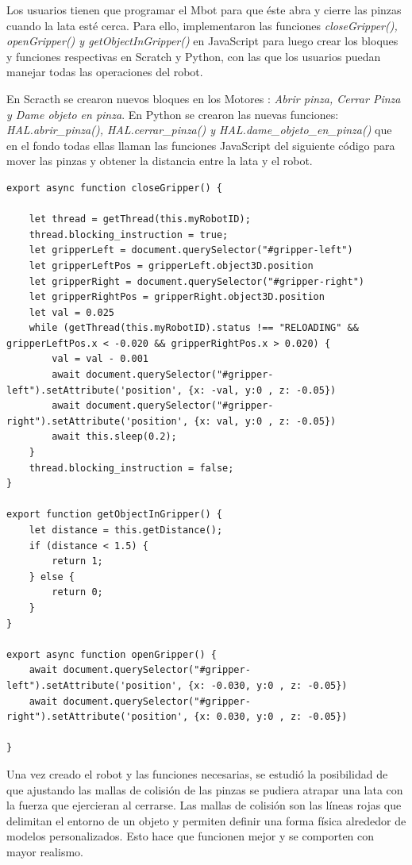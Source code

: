Los usuarios tienen que programar el Mbot para que éste abra y cierre las pinzas cuando la lata esté cerca. Para ello, implementaron las funciones \textit{closeGripper(), openGripper() y getObjectInGripper()} en JavaScript para luego crear los bloques y funciones respectivas en Scratch y Python, con las que los usuarios puedan manejar todas las operaciones del robot. 
 
En Scracth se crearon nuevos bloques en los Motores : \textit{Abrir pinza, Cerrar Pinza y Dame objeto en pinza}.
En Python  se crearon las nuevas funciones: \textit{HAL.abrir\_pinza(), HAL.cerrar\_pinza() y  HAL.dame\_objeto\_en\_pinza()} que en el fondo todas ellas llaman las funciones JavaScript  del siguiente código para mover las pinzas y obtener la distancia entre la lata y el robot.
 
\begin{lstlisting}
export async function closeGripper() {

    let thread = getThread(this.myRobotID);
    thread.blocking_instruction = true;
    let gripperLeft = document.querySelector("#gripper-left")
    let gripperLeftPos = gripperLeft.object3D.position
    let gripperRight = document.querySelector("#gripper-right")
    let gripperRightPos = gripperRight.object3D.position
    let val = 0.025
    while (getThread(this.myRobotID).status !== "RELOADING" && gripperLeftPos.x < -0.020 && gripperRightPos.x > 0.020) {
        val = val - 0.001
        await document.querySelector("#gripper-left").setAttribute('position', {x: -val, y:0 , z: -0.05})
        await document.querySelector("#gripper-right").setAttribute('position', {x: val, y:0 , z: -0.05})
        await this.sleep(0.2);
    }
    thread.blocking_instruction = false;
}

export function getObjectInGripper() {
    let distance = this.getDistance();
    if (distance < 1.5) {
        return 1;
    } else {
        return 0;
    }
}

export async function openGripper() {
    await document.querySelector("#gripper-left").setAttribute('position', {x: -0.030, y:0 , z: -0.05})
    await document.querySelector("#gripper-right").setAttribute('position', {x: 0.030, y:0 , z: -0.05})

}
\end{lstlisting}


Una vez creado el robot y las funciones necesarias, se estudió la posibilidad de que ajustando  las mallas de colisión de las pinzas se pudiera atrapar una lata con la fuerza que ejercieran al cerrarse. 
Las mallas de colisión son las líneas rojas que delimitan el entorno de un objeto y permiten definir una forma física alrededor de modelos personalizados. Esto hace que funcionen mejor y se comporten con mayor realismo.

